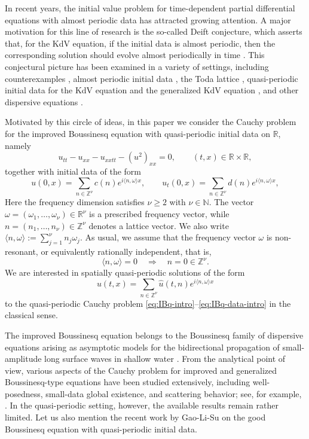 \documentclass[12pt,reqno,tbtags]{amsart}
\newcommand\1{\mathbbm{1}}
\begin{document}
In recent years, the initial value problem for time-dependent partial differential equations with almost periodic data has attracted growing attention. A major motivation for this line of research is the so-called Deift conjecture, which asserts that, for the KdV equation, if the initial data is almost periodic, then the corresponding solution should evolve almost periodically in time \cite{Deift17}. This conjectural picture has been examined in a variety of settings, including counterexamples \cite{CKV24,DLVY21}, almost periodic initial data \cite{BDGL18,EVY19,LY20}, the Toda lattice \cite{BDLV18,LYZZ24,ZC25},  quasi-periodic initial data for the KdV equation \cite{DG16} and the generalized KdV equation \cite{DLX24}, and other dispersive equations \cite{DLX24:JFA, Papenburg25, Schippa25,Xu25}.



Motivated by this circle of ideas, in this paper we consider the Cauchy problem for the improved Boussinesq equation with quasi-periodic initial data on $\mathbb{R}$, namely
\begin{equation}\label{eq:IBq-intro}
    u_{tt}-u_{xx}-u_{xxtt}-(u^2)_{xx}=0,
    \qquad (t,x)\in \mathbb{R}\times\mathbb{R},
\end{equation}
together with initial data of the form
\begin{equation}\label{eq:IBq-data-intro}
    u(0,x)=\sum_{n\in\mathbb{Z}^{\nu}}c(n)e^{i\langle n,\omega\rangle x},
    \qquad
    u_t(0,x)=\sum_{n\in\mathbb{Z}^{\nu}}d(n)e^{i\langle n,\omega\rangle x},
\end{equation}
Here the frequency dimension satisfies $\nu\ge 2$ with $\nu\in\mathbb{N}$. The vector
$
\omega=(\omega_1,\dots,\omega_\nu)\in\mathbb{R}^\nu
$
is a prescribed frequency vector, while
$
n=(n_1,\dots,n_\nu)\in\mathbb{Z}^\nu
$
denotes a lattice vector. We also write 
$
\langle n,\omega\rangle:=\sum_{j=1}^{\nu} n_j\omega_j.
$
As usual, we assume that the frequency vector $\omega$ is non-resonant, or equivalently rationally independent, that is,
\[
\langle n,\omega\rangle=0 \quad \Longrightarrow \quad n=0\in\mathbb{Z}^\nu.
\] We are interested in spatially quasi-periodic solutions of the form
\begin{equation}\label{eq:IBq-solution-intro}
    u(t,x)=\sum_{n\in\mathbb{Z}^{\nu}}\widehat{u}(t,n)e^{i\langle n,\omega\rangle x}
\end{equation}
to the quasi-periodic Cauchy problem \eqref{eq:IBq-intro}--\eqref{eq:IBq-data-intro} in the classical sense.

The improved Boussinesq equation belongs to the Boussinesq family of dispersive equations arising as asymptotic models for the bidirectional propagation of small-amplitude long surface waves in shallow water \cite{BS76,BCS02,BCS04}. From the analytical point of view, various aspects of the Cauchy problem for improved and generalized Boussinesq-type equations have been studied extensively, including well-posedness, small-data global existence, and scattering behavior; see, for example, \cite{WC02a,Wang09, WC02b,CO06}. In the quasi-periodic setting, however, the available results remain rather limited. Let us also mention the recent work by Gao-Li-Su\cite{GLS23} on the good Boussinesq equation with quasi-periodic initial data.
\end{document}
